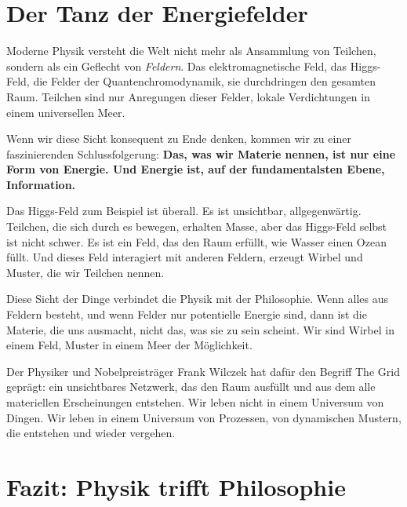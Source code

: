 \section{Der Tanz der Energiefelder}

Moderne Physik versteht die Welt nicht mehr als Ansammlung von Teilchen, sondern als ein Geflecht von \emph{Feldern}. Das elektromagnetische Feld, das Higgs-Feld, die Felder der Quantenchromodynamik, sie durchdringen den gesamten Raum. Teilchen sind nur Anregungen dieser Felder, lokale Verdichtungen in einem universellen Meer.

Wenn wir diese Sicht konsequent zu Ende denken, kommen wir zu einer faszinierenden Schlussfolgerung: \textbf{Das, was wir \glqq Materie\grqq{} nennen, ist nur eine Form von Energie. Und Energie ist, auf der fundamentalsten Ebene, Information.}

Das Higgs-Feld zum Beispiel ist überall. Es ist unsichtbar, allgegenwärtig. Teilchen, die sich durch es bewegen, erhalten Masse, aber das Higgs-Feld selbst ist nicht \glqq schwer\grqq{}. Es ist ein Feld, das den Raum erfüllt, wie Wasser einen Ozean füllt. Und dieses Feld interagiert mit anderen Feldern, erzeugt Wirbel und Muster, die wir \glqq Teilchen\grqq{} nennen.

Diese Sicht der Dinge verbindet die Physik mit der Philosophie. Wenn alles aus Feldern besteht, und wenn Felder nur \glqq potentielle Energie\grqq{} sind, dann ist die Materie, die uns ausmacht, nicht das, was sie zu sein scheint. Wir sind Wirbel in einem Feld, Muster in einem Meer der Möglichkeit.

Der Physiker und Nobelpreisträger Frank Wilczek hat dafür den Begriff \glqq The Grid\grqq{} geprägt: ein unsichtbares Netzwerk, das den Raum ausfüllt und aus dem alle materiellen Erscheinungen entstehen. Wir leben nicht in einem Universum von \glqq Dingen\grqq{}. Wir leben in einem Universum von \glqq Prozessen\grqq{}, von dynamischen Mustern, die entstehen und wieder vergehen.

\section{Fazit: Physik trifft Philosophie}

